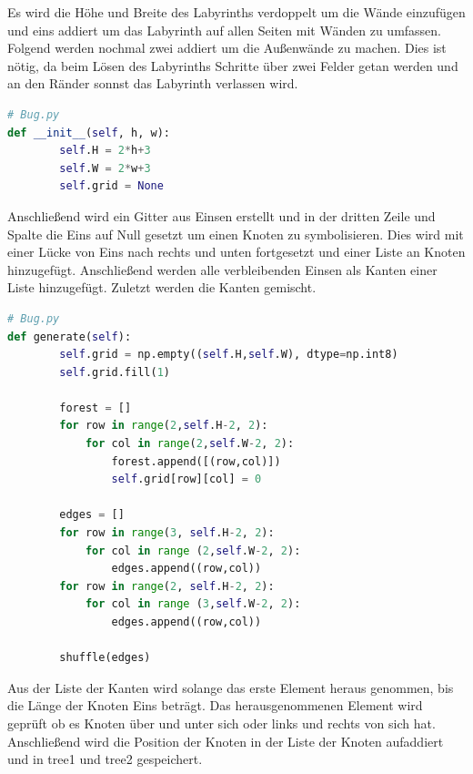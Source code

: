 \documentclass[12pt, a4paper, titlepage]{article}
\begin{document}
Es wird die Höhe und Breite des Labyrinths verdoppelt um die Wände einzufügen und eins addiert um das Labyrinth auf allen Seiten mit Wänden zu umfassen.
Folgend werden nochmal zwei addiert um die Außenwände  zu machen. Dies ist nötig, da beim Lösen des Labyrinths Schritte über zwei Felder getan werden und an den Ränder sonnst das Labyrinth verlassen wird.
\begin{lstlisting}[language = Python]
# Bug.py
def __init__(self, h, w):
        self.H = 2*h+3
        self.W = 2*w+3
        self.grid = None
\end{lstlisting}

Anschließend wird ein Gitter aus Einsen erstellt und in der dritten Zeile und Spalte die Eins auf Null gesetzt um einen Knoten zu symbolisieren.
Dies wird mit einer Lücke von Eins nach rechts und unten fortgesetzt und einer Liste an Knoten hinzugefügt.
Anschließend werden alle verbleibenden Einsen als Kanten einer Liste hinzugefügt.
Zuletzt werden die Kanten gemischt.

\begin{lstlisting}[language = Python]
# Bug.py
def generate(self):
        self.grid = np.empty((self.H,self.W), dtype=np.int8)
        self.grid.fill(1)
        
        forest = []
        for row in range(2,self.H-2, 2):
            for col in range(2,self.W-2, 2):
                forest.append([(row,col)])
                self.grid[row][col] = 0
        
        edges = []
        for row in range(3, self.H-2, 2):
            for col in range (2,self.W-2, 2):
                edges.append((row,col))
        for row in range(2, self.H-2, 2):
            for col in range (3,self.W-2, 2):
                edges.append((row,col))
        
        shuffle(edges)
\end{lstlisting}

Aus der Liste der Kanten wird solange das erste Element heraus genommen, bis die Länge der Knoten Eins beträgt.
Das herausgenommenen Element wird geprüft ob es Knoten über und unter sich oder links und rechts von sich hat.
Anschließend wird die Position der Knoten in der Liste der Knoten aufaddiert und in tree1 und tree2 gespeichert.
\end{document}
